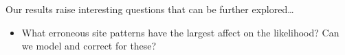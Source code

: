 Our results raise interesting questions that can be further explored\ldots
\begin{itemize}
    \item What erroneous site patterns have the largest affect on
        the likelihood? Can we model and correct for these?
\end{itemize}
